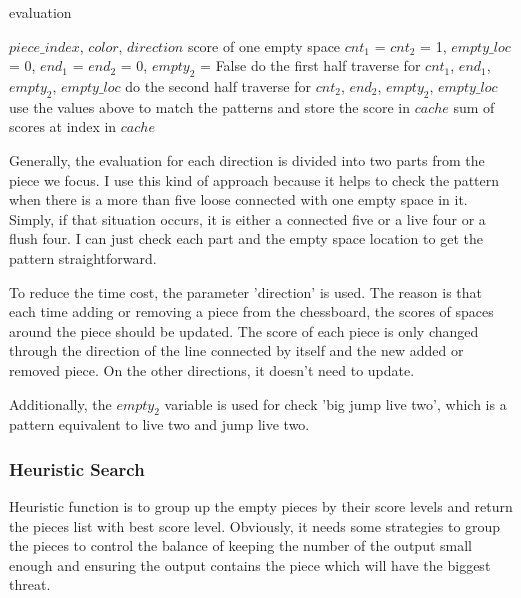 \documentclass[conference,compsoc]{IEEEtran}
\renewcommand{\algorithmicrequire}{\textbf{Input:}}
\renewcommand{\algorithmicensure}{\textbf{Output:}}
\begin{document}
\begin{algorithm}
 \caption{evaluation}
 \begin{algorithmic}[h]
 \renewcommand{\algorithmicrequire}{\textbf{Input:}}
 \renewcommand{\algorithmicensure}{\textbf{Output:}}
 \REQUIRE $piece\_index$, $color$, $direction$
 \ENSURE score of one empty space 
  \STATE $cnt_1$ = $cnt_2$ = 1, $empty\_loc$ = 0, $end_1$ = $end_2$ = 0, $empty_2$ = False
  \STATE do the first half traverse for $cnt_1$, $end_1$, $empty_2$, $empty\_loc$
  \STATE do the second half traverse for $cnt_2$, $end_2$, $empty_2$, $empty\_loc$
  \ENDIF
  \STATE use the values above to match the patterns and store the score in $cache$
  \ENDIF
  \ENDFOR
  \RETURN sum of scores at index in $cache$
 \end{algorithmic} 
 \end{algorithm}
 
Generally, the evaluation for each direction is divided into two parts from the piece we focus. I use this kind of approach because it helps to check the pattern when there is a more than five loose connected with one empty space in it. Simply, if that situation occurs, it is either a connected five or a live four or a flush four. I can just check each part and the empty space location to get the pattern straightforward.

To reduce the time cost, the parameter 'direction' is used. The reason is that each time adding or removing a piece from the chessboard, the scores of spaces around the piece should be updated. The score of each piece is only changed through the direction of the line connected by itself and the new added or removed piece. On the other directions, it doesn't need to update.

Additionally, the $empty_2$ variable is used for check 'big jump live two', which is a pattern equivalent to live two and jump live two. 

\subsubsection{Heuristic Search}
Heuristic function is to group up the empty pieces by their score levels and return the pieces list with best score level. Obviously, it needs some strategies to group the pieces to control the balance of keeping the number of the output small enough and ensuring the output contains the piece which will have the biggest threat. 
\end{document}
